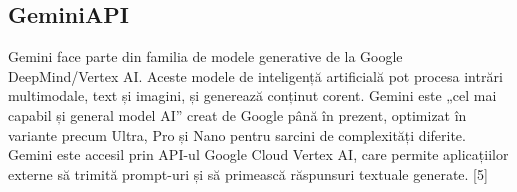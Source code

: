 \subsection{GeminiAPI}

Gemini face parte din familia de modele generative de la Google DeepMind/Vertex AI. Aceste modele de inteligență artificială pot procesa intrări multimodale, text și imagini, și generează
conținut corent. Gemini este „cel mai capabil și general model AI” creat de Google până în prezent, optimizat în variante precum Ultra, Pro și Nano pentru sarcini de complexități diferite. 
Gemini este accesil prin API-ul Google Cloud Vertex AI, care permite aplicațiilor externe să trimită prompt-uri și să primească răspunsuri textuale generate. [5]